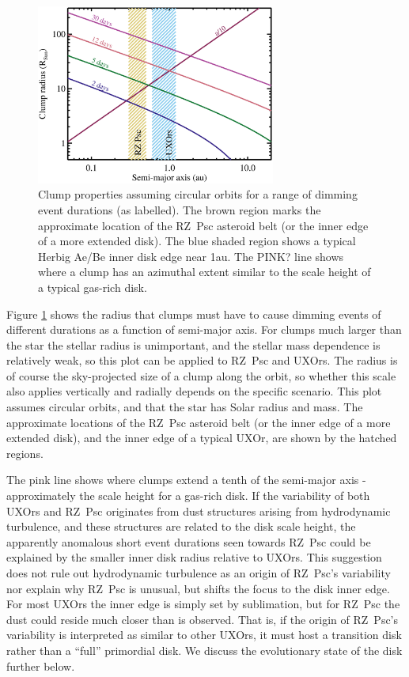 \documentclass[]{rsos}
\begin{document}
\begin{figure}
  \begin{center}
    \hspace{-0.5cm} \includegraphics[width=0.7\textwidth]{figs/rcl-a.eps}
    \caption{Clump properties assuming circular orbits for a range of dimming event
      durations (as labelled). The brown region marks the approximate location of the
      RZ~Psc asteroid belt (or the inner edge of a more extended disk). The blue shaded
      region shows a typical Herbig Ae/Be inner disk edge near 1au. The PINK? line shows
      where a clump has an azimuthal extent similar to the scale height of a typical
      gas-rich disk.}\label{fig:rcla}
  \end{center}
\end{figure}

Figure \ref{fig:rcla} shows the radius that clumps must have to cause dimming events of
different durations as a function of semi-major axis. For clumps much larger than the
star the stellar radius is unimportant, and the stellar mass dependence is relatively
weak, so this plot can be applied to RZ~Psc and UXOrs. The radius is of course the
sky-projected size of a clump along the orbit, so whether this scale also applies
vertically and radially depends on the specific scenario. This plot assumes circular
orbits, and that the star has Solar radius and mass. The approximate locations of the
RZ~Psc asteroid belt (or the inner edge of a more extended disk), and the inner edge of a
typical UXOr, are shown by the hatched regions.

The pink line shows where clumps extend a tenth of the semi-major axis - approximately
the scale height for a gas-rich disk. If the variability of both UXOrs and RZ~Psc
originates from dust structures arising from hydrodynamic turbulence, and these
structures are related to the disk scale height, the apparently anomalous short event
durations seen towards RZ~Psc could be explained by the smaller inner disk radius
relative to UXOrs. This suggestion does not rule out hydrodynamic turbulence as an origin
of RZ~Psc's variability nor explain why RZ~Psc is unusual, but shifts the focus to the
disk inner edge. For most UXOrs the inner edge is simply set by sublimation, but for
RZ~Psc the dust could reside much closer than is observed. That is, if the origin of
RZ~Psc's variability is interpreted as similar to other UXOrs, it must host a transition
disk rather than a ``full'' primordial disk. We discuss the evolutionary state of the
disk further below.
\end{document}
